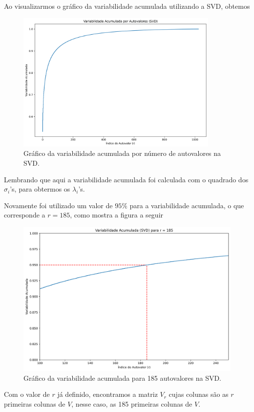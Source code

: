 \documentclass[a4paper, 12pt]{article}
\theoremstyle{definition}
\theoremstyle{remark}
\begin{document}
Ao visualizarmos o gráfico da variabilidade acumulada utilizando a SVD, obtemos

\begin{figure}[H]
  \centering
  \includegraphics[width=10cm]{var_acu_svd}
  \caption{Gráfico da variabilidade acumulada por número de autovalores na SVD.}
\end{figure}

Lembrando que aqui a variabilidade acumulada foi calculada com o quadrado dos $\sigma_i$'s, para obtermos os $\lambda_i$'s.

Novamente foi utilizado um valor de $95\%$ para a variabilidade acumulada, o que corresponde a $r = 185$, como mostra a figura a seguir

\begin{figure}[H]
  \centering
  \includegraphics[width=12cm]{var_acu_svd_185}
  \caption{Gráfico da variabilidade acumulada para 185 autovalores na SVD.}
\end{figure}

Com o valor de $r$ já definido, encontramos a matriz $V_r$ cujas colunas são as $r$ primeiras colunas de $V$, nesse caso, as 185 primeiras colunas de $V$.
\end{document}
